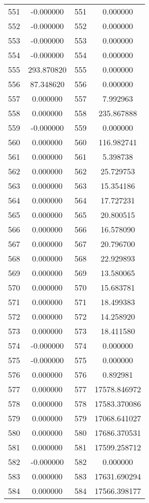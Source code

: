 \documentclass[12pt]{article}
\begin{document}
\begin{longtable}{@{}cccc@{}}
551 & -0.000000 & 551 & 0.000000 \\
552 & -0.000000 & 552 & 0.000000 \\
553 & -0.000000 & 553 & 0.000000 \\
554 & -0.000000 & 554 & 0.000000 \\
555 & 293.870820 & 555 & 0.000000 \\
556 & 87.348620 & 556 & 0.000000 \\
557 & 0.000000 & 557 & 7.992963 \\
558 & 0.000000 & 558 & 235.867888 \\
559 & -0.000000 & 559 & 0.000000 \\
560 & 0.000000 & 560 & 116.982741 \\
561 & 0.000000 & 561 & 5.398738 \\
562 & 0.000000 & 562 & 25.729753 \\
563 & 0.000000 & 563 & 15.354186 \\
564 & 0.000000 & 564 & 17.727231 \\
565 & 0.000000 & 565 & 20.800515 \\
566 & 0.000000 & 566 & 16.578090 \\
567 & 0.000000 & 567 & 20.796700 \\
568 & 0.000000 & 568 & 22.929893 \\
569 & 0.000000 & 569 & 13.580065 \\
570 & 0.000000 & 570 & 15.683781 \\
571 & 0.000000 & 571 & 18.499383 \\
572 & 0.000000 & 572 & 14.258920 \\
573 & 0.000000 & 573 & 18.411580 \\
574 & -0.000000 & 574 & 0.000000 \\
575 & -0.000000 & 575 & 0.000000 \\
576 & 0.000000 & 576 & 0.892981 \\
577 & 0.000000 & 577 & 17578.846972 \\
578 & 0.000000 & 578 & 17583.370086 \\
579 & 0.000000 & 579 & 17068.641027 \\
580 & 0.000000 & 580 & 17686.370531 \\
581 & 0.000000 & 581 & 17599.258712 \\
582 & -0.000000 & 582 & 0.000000 \\
583 & 0.000000 & 583 & 17631.690294 \\
584 & 0.000000 & 584 & 17566.398177 \\

\end{longtable}
\end{document}
